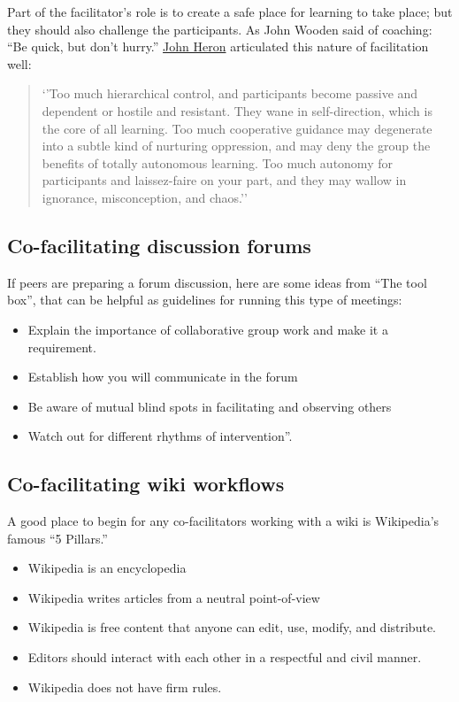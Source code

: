 Part of the facilitator's role is to create a safe place for learning to
take place; but they should also challenge the participants. As John
Wooden said of coaching: ``Be quick, but don't hurry.''
\href{http://en.wikipedia.org/wiki/John\_Heron}{John Heron} articulated
this nature of facilitation well:

\begin{quote}
`'Too much hierarchical control, and participants become passive and
dependent or hostile and resistant. They wane in self-direction, which
is the core of all learning. Too much cooperative guidance may
degenerate into a subtle kind of nurturing oppression, and may deny the
group the benefits of totally autonomous learning. Too much autonomy for
participants and laissez-faire on your part, and they may wallow in
ignorance, misconception, and chaos.''
\end{quote}
\subsection{Co-facilitating discussion forums}

If peers are preparing a forum discussion, here are some ideas from
``The tool box'', that can be helpful as guidelines for running this
type of meetings:

\begin{itemize}
\item
  Explain the importance of collaborative group work and make it a
  requirement.
\item
  Establish how you will communicate in the forum
\item
  Be aware of mutual blind spots in facilitating and observing others
\item
  Watch out for different rhythms of intervention''.
\end{itemize}
\subsection{Co-facilitating wiki workflows}

A good place to begin for any co-facilitators working with a wiki is
Wikipedia's famous ``5 Pillars.''

\begin{itemize}
\item
  Wikipedia is an encyclopedia
\item
  Wikipedia writes articles from a neutral point-of-view
\item
  Wikipedia is free content that anyone can edit, use, modify, and
  distribute.
\item
  Editors should interact with each other in a respectful and civil
  manner.
\item
  Wikipedia does not have firm rules.
\end{itemize}
